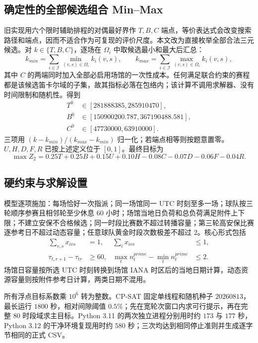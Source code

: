 \subsection{确定性的全部候选组合 Min--Max}

旧实现用六个限时辅助排程的对偶最好界作 $T,B,C$ 端点，等价表达式会改变搜索路径和端点，因而不适合作为可复现的评价尺度。本文改为直接枚举全部合法三元候选。对 $k\in\{T,B,C\}$，逐场在 $\Omega_i$ 中取候选最小和最大后汇总：
\begin{equation}
k_{min}=\sum_{i\in\mathcal I}\min_{(v,s)\in\Omega_i}k_i(v,s),\qquad
k_{max}=\sum_{i\in\mathcal I}\max_{(v,s)\in\Omega_i}k_i(v,s),
\end{equation}
其中 $C$ 的两端同时加入全部必启用场馆的一次性成本。任何满足联合约束的赛程都是该候选笛卡尔域的子集，故其指标必落在包络内；该计算不调用求解器、没有时间限制和随机性。得到
\begin{align}
T^0&\in[281888385,285910470],\\
B^0&\in[150900200.787,367190488.581],\\
C^0&\in[47730000,63910000].
\end{align}
三项用 $(k-k_{min})/(k_{max}-k_{min})$ 归一化；若端点相等则按题意置零。$U,H,D,F,R$ 已按上述定义位于 $[0,1]$。最终目标为
\begin{equation}
\max Z_2=0.25T+0.25B+0.15U+0.10H-0.08C-0.07D-0.06F-0.04R.
\end{equation}

\subsection{硬约束与求解设置}

模型逐项施加：每场恰好一次指派；同一场馆同一 UTC 时刻至多一场；球队按三轮顺序参赛且相邻轮至少休息 $60$ 小时；场馆当地日负荷和总负荷满足附件上下限；不建立安保不合格候选；同一时段比赛数不超过转播容量；第三轮高安保比赛逐参考日不超过动态容量；任意球队黄金时段次数极差不超过 $2$。核心形式包括
\begin{align}
\sum_{v,s}x_{ivs}&=1,&
\sum_i x_{ivs}&\le1,\\
\tau_{t,r+1}-\tau_{tr}&\ge60,&
\max_t n_t^{prime}-\min_t n_t^{prime}&\le2.
\end{align}
场馆日容量按所选 UTC 时刻转换到场馆 IANA 时区后的当地日期计算，动态资源容量则按附件参考日计算，两类日期不混用。

所有浮点目标系数乘 $10^6$ 转为整数。CP-SAT 固定单线程和随机种子 $20260813$，最长运行 $1800$ 秒，相对间隙阈值 $0.5\%$；先在宽轮次窗口内求可行提示，再在完整 $80$ 时段域求主目标。Python 3.11 的两次独立进程分别用时约 $173$ 与 $177$ 秒，Python 3.12 的干净环境复现用时约 $580$ 秒；三次均达到相同停止准则并生成逐字节相同的正式 CSV。

